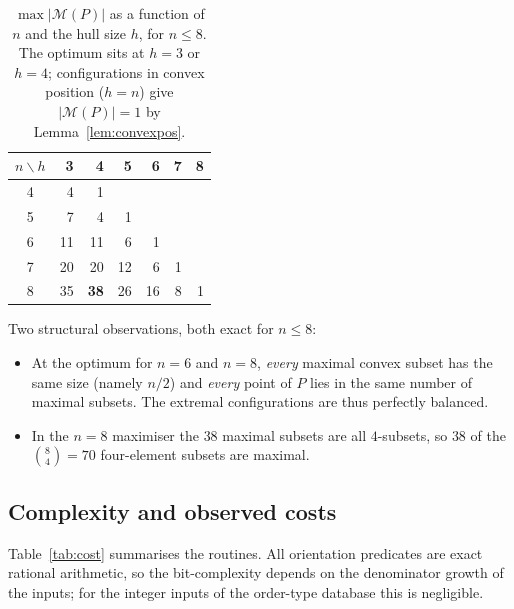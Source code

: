 \documentclass[11pt,a4paper]{article}
\theoremstyle{definition}
\newcommand{\M}{\mathcal{M}}
\begin{document}
\begin{table}[ht]
\centering
\caption{$\max|\M(P)|$ as a function of $n$ and the hull size $h$, for $n\le 8$.
The optimum sits at $h=3$ or $h=4$; configurations in convex position ($h=n$) give
$|\M(P)|=1$ by Lemma~\ref{lem:convexpos}.}
\label{tab:layer}
\begin{tabular}{c r r r r r r}
\toprule
$n \backslash h$ & 3 & 4 & 5 & 6 & 7 & 8 \\
\midrule
4 & 4 & 1 &   &   &   &   \\
5 & 7 & 4 & 1 &   &   &   \\
6 & 11 & 11 & 6 & 1 &  &   \\
7 & 20 & 20 & 12 & 6 & 1 &  \\
8 & 35 & \textbf{38} & 26 & 16 & 8 & 1 \\
\bottomrule
\end{tabular}
\end{table}

Two structural observations, both exact for $n\le 8$:

\begin{itemize}[leftmargin=*]
\item At the optimum for $n=6$ and $n=8$, \emph{every} maximal convex subset has
  the same size (namely $n/2$) and \emph{every} point of $P$ lies in the same
  number of maximal subsets.  The extremal configurations are thus perfectly
  balanced.
\item In the $n=8$ maximiser the $38$ maximal subsets are all $4$-subsets, so
  $38$ of the $\binom{8}{4}=70$ four-element subsets are maximal.
\end{itemize}

\subsection{Complexity and observed costs}

Table~\ref{tab:cost} summarises the routines.  All orientation predicates are exact
rational arithmetic, so the bit-complexity depends on the denominator growth of the
inputs; for the integer inputs of the order-type database this is negligible.
\end{document}
